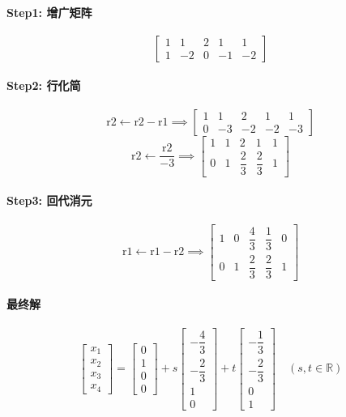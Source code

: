 \paragraph{Step1: 增广矩阵}  
\[
\left[\begin{array}{cccc|c}
1 & 1 & 2 & 1 & 1 \\
1 & -2 & 0 & -1 & -2
\end{array}\right]
\]

\paragraph{Step2: 行化简}  
\[
\text{r2} \leftarrow \text{r2} - \text{r1} \implies
\left[\begin{array}{cccc|c}
1 & 1 & 2 & 1 & 1 \\
0 & -3 & -2 & -2 & -3
\end{array}\right]
\]
\[
\text{r2} \leftarrow \dfrac{\text{r2}}{-3} \implies
\left[\begin{array}{cccc|c}
1 & 1 & 2 & 1 & 1 \\
0 & 1 & \dfrac{2}{3} & \dfrac{2}{3} & 1
\end{array}\right]
\]

\paragraph{Step3: 回代消元}  
\[
\text{r1} \leftarrow \text{r1} - \text{r2} \implies
\left[\begin{array}{cccc|c}
1 & 0 & \dfrac{4}{3} & \dfrac{1}{3} & 0 \\
0 & 1 & \dfrac{2}{3} & \dfrac{2}{3} & 1
\end{array}\right]
\]

\paragraph{最终解}  
\[
\begin{bmatrix}
x_1 \\ x_2 \\ x_3 \\ x_4
\end{bmatrix}
=
\begin{bmatrix}
0 \\ 1 \\ 0 \\ 0
\end{bmatrix}
+
s
\begin{bmatrix}
-\dfrac{4}{3} \\ -\dfrac{2}{3} \\ 1 \\ 0
\end{bmatrix}
+
t
\begin{bmatrix}
-\dfrac{1}{3} \\ -\dfrac{2}{3} \\ 0 \\ 1
\end{bmatrix}
\quad (s, t \in \mathbb{R})
\]